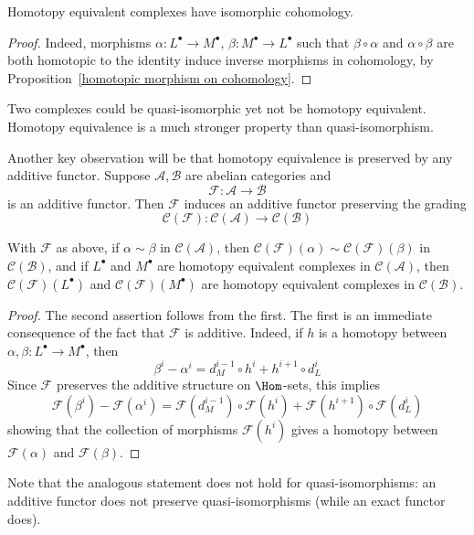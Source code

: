 \begin{corollary}\label{homo comple}
Homotopy equivalent complexes have isomorphic cohomology.
\end{corollary}
\begin{proof}
Indeed, morphisms $\alpha:L^\bullet\to M^\bullet$, $\beta:M^\bullet\to L^\bullet$ such that $\beta\circ\alpha$ and $\alpha\circ\beta$ are both homotopic to the identity induce inverse morphisms in cohomology, by Proposition~\ref{homotopic morphism on cohomology}.
\end{proof}
\begin{remark}
Two complexes could be quasi-isomorphic yet not be homotopy equivalent. Homotopy equivalence is a much stronger property than quasi-isomorphism.
\end{remark}
Another key observation will be that homotopy equivalence is preserved by any additive functor. Suppose $\mathcal{A},\mathcal{B}$ are abelian categories and
\[\mathscr{F}:\mathcal{A}\to\mathcal{B}\]
is an additive functor. Then $\mathscr{F}$ induces an additive functor preserving the grading
\[\mathcal{C}(\mathscr{F}):\mathcal{C}(\mathcal{A})\to\mathcal{C}(\mathcal{B})\]
\begin{lemma}\label{homotopy add func}
With $\mathscr{F}$ as above, if $\alpha\sim\beta$ in $\mathcal{C}(\mathcal{A})$, then $\mathcal{C}(\mathscr{F})(\alpha)\sim\mathcal{C}(\mathscr{F})(\beta)$ in $\mathcal{C}(\mathcal{B})$, and if $L^\bullet$ and $M^\bullet$ are homotopy equivalent complexes in $\mathcal{C}(\mathcal{A})$, then $\mathcal{C}(\mathscr{F})(L^\bullet)$ and $\mathcal{C}(\mathscr{F})(M^\bullet)$ are homotopy equivalent complexes in $\mathcal{C}(\mathcal{B})$.
\end{lemma}
\begin{proof}
The second assertion follows from the first. The first is an immediate consequence of the fact that $\mathscr{F}$ is additive. Indeed, if $h$ is a homotopy between $\alpha,\beta:L^\bullet\to M^\bullet$, then
\[\beta^i-\alpha^i=d_M^{i-1}\circ h^i+h^{i+1}\circ d_L^i\]
Since $\mathscr{F}$ preserves the additive structure on $\Hom$-sets, this implies
\[\mathscr{F}(\beta^i)-\mathscr{F}(\alpha^i)=\mathscr{F}(d_M^{i-1})\circ\mathscr{F}(h^i)+\mathscr{F}(h^{i+1})\circ\mathscr{F}(d_L^i)\]
showing that the collection of morphisms $\mathscr{F}(h^i)$ gives a homotopy between $\mathscr{F}(\alpha)$ and $\mathscr{F}(\beta)$.
\end{proof}
Note that the analogous statement does not hold for quasi-isomorphisms: an additive functor does not preserve quasi-isomorphisms (while an exact functor does).\par
